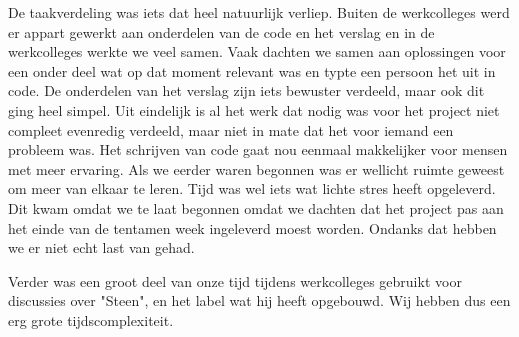 \documentclass{article}
\begin{document}
De taakverdeling was iets dat heel natuurlijk verliep. Buiten de werkcolleges werd er appart gewerkt aan onderdelen van de code en het verslag en in de werkcolleges werkte we veel samen. Vaak dachten we samen aan oplossingen voor een onder deel wat op dat moment relevant was en typte een persoon het uit in code. De onderdelen van het verslag zijn iets bewuster verdeeld, maar ook dit ging heel simpel. Uit eindelijk is al het werk dat nodig was voor het project niet compleet evenredig verdeeld, maar niet in mate dat het voor iemand een probleem was. Het schrijven van code gaat nou eenmaal makkelijker voor mensen met meer ervaring. Als we eerder waren begonnen was er wellicht ruimte geweest om meer van elkaar te leren. \newline
Tijd was wel iets wat lichte stres heeft opgeleverd. Dit kwam omdat we te laat begonnen omdat we dachten dat het project pas aan het einde van de tentamen week ingeleverd moest worden. Ondanks dat hebben we er niet echt last van gehad.

Verder was een groot deel van onze tijd tijdens werkcolleges gebruikt voor discussies over "Steen", en het label wat hij heeft opgebouwd. Wij hebben dus een erg grote tijdscomplexiteit. 
\end{document}
